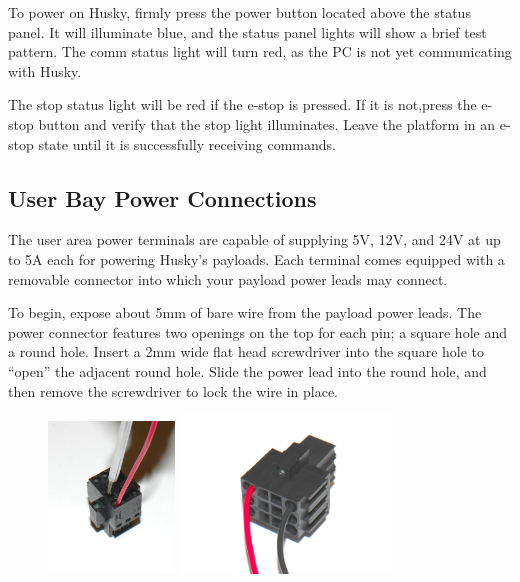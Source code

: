 \documentclass[]{clearpath-latex/clearpath-manual}
\begin{document}
To power on Husky, firmly press the power button located above the status panel. It will illuminate blue, and the 
status panel lights will show a brief test pattern. The comm status light will turn red, as the PC is not yet 
communicating with Husky.

The stop status light will be red if the e-stop is pressed. If it is not,press the e-stop button and 
verify that the stop light illuminates. Leave the platform in an e-stop state until it is successfully receiving commands.

\subsection{User Bay Power Connections}
The user area power terminals are capable of supplying 5V, 12V, and 24V at up to 5A each for powering Husky’s payloads.  
Each terminal comes equipped with a removable connector into which your payload power leads may connect.

To begin, expose about 5mm of bare wire from the payload power leads. The power connector features two 
openings on the top for each pin; a square hole and a round hole. Insert a 2mm wide flat head screwdriver 
into the square hole to “open” the adjacent round hole. Slide the power lead into the round hole, and then 
remove the screwdriver to lock the wire in place.

\begin{figure}[h]
	\centering
	\includegraphics[width=0.3\textwidth]{power-connector-1.png}
	\includegraphics[width=0.5\textwidth]{power-connector-2.png}
\end{figure}
\end{document}

